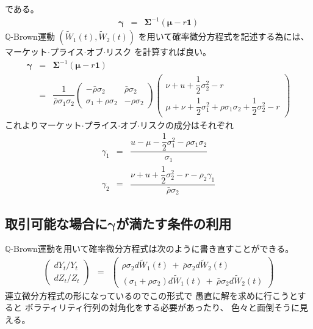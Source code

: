 \documentclass[uplatex,a4j,12pt,dvipdfmx]{jsarticle}
\begin{document}
である。
%
%
\begin{eqnarray}
	{\bm \gamma}
	&=&
	{\bm \Sigma}^{-1}
	( {\bm \mu} - r {\bm 1} )
\end{eqnarray}
%
%
$\mathbb{Q}$-Brown運動
$(\tilde{W}_{1}(t),\tilde{W}_{2}(t))$
を用いて確率微分方程式を記述する為には、
マーケット$\cdot$プライス$\cdot$オブ$\cdot$リスク
を計算すれば良い。
%
%
\begin{eqnarray}
	{\bm \gamma}
	&=&
	{\bm \Sigma}^{-1}
	( {\bm \mu} - r {\bm 1} )
	\\ &=&
	\dfrac{1}{ \bar{\rho} \sigma_{1} \sigma_{2} }
	\left(
	\!\!
	\begin{array}{cc}
			- \bar{\rho} \sigma_{2}      & \bar{\rho} \sigma_{2}
			\\
			\sigma_{1} + \rho \sigma_{2} & - \rho \sigma_{2}
		\end{array}
	\!\!
	\right)
	\!\!
	\left(
	\begin{array}{c}
			\nu + u + \dfrac{1}{2} \sigma_{2}^{2} - r
			\\
			\mu + \nu + \dfrac{1}{2} \sigma_{1}^{2} + \rho \sigma_{1} \sigma_{2} + \dfrac{1}{2} \sigma_{2}^{2} - r
		\end{array}
	\right)
\end{eqnarray}
%
%
これよりマーケット$\cdot$プライス$\cdot$オブ$\cdot$リスクの成分はそれぞれ
%
%
\begin{eqnarray}
	\gamma_{1}
	&=&
	\dfrac{
		u
		-
		\mu - \dfrac{1}{2} \sigma_{1}^{2} - \rho \sigma_{1} \sigma_{2}
	}
	{ \sigma_{1} }
	\\[3mm]
	\gamma_{2}
	&=&
	\dfrac{
		\nu + u + \dfrac{1}{2} \sigma_{2}^{2} - r - \rho_{2} \gamma_{1}
	}
	{ \bar{\rho} \sigma_{2} }
\end{eqnarray}
%
%

\subsection*{取引可能な場合に$\bm{\gamma}$が満たす条件の利用}
$\mathbb{Q}$-Brown運動を用いて確率微分方程式は次のように書き直すことができる。
%
%
\begin{eqnarray}
	\left(
	\begin{array}{c}
		d Y_{t} / Y_{t}
		\\
		d Z_{t} / Z_{t}
	\end{array}
	\right)
	&=&
	\left(
	\begin{array}{l}
		\rho \sigma_{2} d \tilde{W}_{1}(t) \ + \ \bar{\rho} \sigma_{2} d \tilde{W}_{2}(t)
		\\
		( \sigma_{1} + \rho \sigma_{2} ) d \tilde{W}_{1}(t) \ + \ \bar{\rho} \sigma_{2} d \tilde{W}_{2}(t)
	\end{array}
	\right)
\end{eqnarray}
%
%
連立微分方程式の形になっているのでこの形式で
愚直に解を求めに行こうとすると
ボラティリティ行列の対角化をする必要があったり、
色々と面倒そうに見える。
\end{document}
